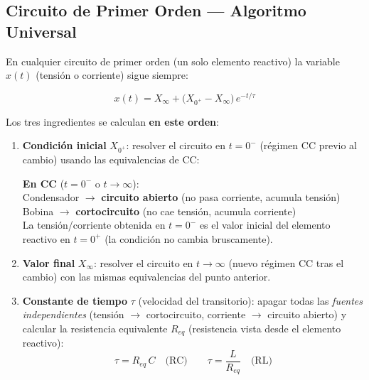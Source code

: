 \documentclass[12pt,a4paper]{article}
\begin{document}
\subsection{Circuito de Primer Orden — Algoritmo Universal}

En cualquier circuito de primer orden (un solo elemento reactivo) la variable $x(t)$
(tensión o corriente) sigue siempre:

\begin{formulabox}
\[
  \boxed{x(t) = X_\infty + \bigl(X_{0^+} - X_\infty\bigr)\,e^{-t/\tau}}
\]
\end{formulabox}

Los tres ingredientes se calculan \textbf{en este orden}:

\begin{enumerate}[leftmargin=2em, itemsep=6pt]

  \item \textbf{Condición inicial} $X_{0^+}$: resolver el circuito en $t = 0^-$
  (régimen CC previo al cambio) usando las equivalencias de CC:
  \begin{formulabox}
    \textbf{En CC} ($t = 0^-$ o $t \to \infty$):\\[4pt]
    \quad Condensador $\longrightarrow$ \textbf{circuito abierto} \quad
    (no pasa corriente, acumula tensión)\\
    \quad Bobina $\longrightarrow$ \textbf{cortocircuito} \quad
    (no cae tensión, acumula corriente)\\[4pt]
    La tensión/corriente obtenida en $t = 0^-$ es el valor inicial del elemento reactivo
    en $t = 0^+$ (la condición no cambia bruscamente).
  \end{formulabox}

  \item \textbf{Valor final} $X_\infty$: resolver el circuito en $t \to \infty$
  (nuevo régimen CC tras el cambio) con las mismas equivalencias del punto anterior.

  \item \textbf{Constante de tiempo} $\tau$ (velocidad del transitorio): apagar todas las \emph{fuentes independientes}
  (tensión $\to$ cortocircuito, corriente $\to$ circuito abierto) y calcular la resistencia
  equivalente $R_{eq}$ (resistencia vista desde el elemento reactivo):
  \[
    \tau = R_{eq}\,C \quad \text{(RC)} \qquad \tau = \frac{L}{R_{eq}} \quad \text{(RL)}
  \]
\end{enumerate}
\clearpage %
\end{document}
